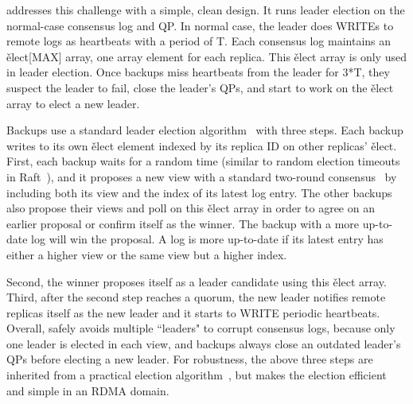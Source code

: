 \xxx addresses this challenge with a simple, clean design. It runs leader 
election on the normal-case consensus log and QP. In normal case, the 
leader does WRITEs to remote logs as heartbeats with a period of T. Each 
consensus log maintains an \v{elect[MAX]} array, one array
element for each replica. This \v{elect} array is only used in leader election. 
Once backups miss heartbeats from the leader for 3*T, they suspect the leader 
to fail, close the leader's QPs, and start to work on the \v{elect} array to 
elect a new leader.

Backups use a standard \paxos leader election algorithm~\cite{paxos:practical} 
with three steps. Each backup writes to its own \v{elect} element indexed by 
its replica ID on other replicas' \v{elect}. First, each backup waits for a 
random time (similar to random election timeouts in Raft~\cite{raft:usenix14}), 
and it proposes a new view with a standard two-round 
\paxos consensus~\cite{paxos:simple} by including both its view and the index 
of its latest log entry. The other backups also propose their views and poll on 
this \v{elect} array in order to agree on an earlier proposal or confirm itself 
as the winner. The backup with a more up-to-date log will win the proposal. A 
log is more up-to-date if its latest entry has either a higher view or the same 
view but a higher index.

Second, the winner proposes itself as a leader candidate using this \v{elect}
array. Third, after the second step reaches a quorum, the new leader notifies 
remote replicas itself as the new leader and it starts to WRITE periodic 
heartbeats. Overall, \xxx safely avoids multiple ``leaders" to corrupt 
consensus logs, because only one leader is elected in each view, and backups 
always close an outdated leader's QPs before electing a new leader. For 
robustness, the above three steps are inherited from a practical \paxos 
election algorithm~\cite{paxos:practical}, but \xxx makes the election 
efficient and simple in an RDMA domain.